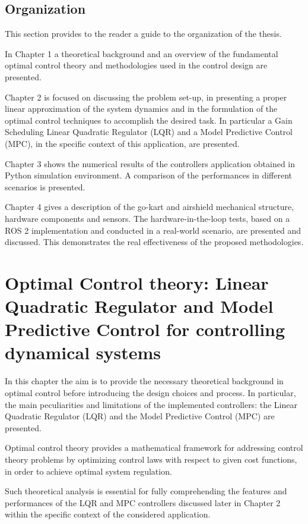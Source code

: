 \documentclass[a4paper,12pt,oneside]{book}
\begin{document}
\section*{Organization}
This section provides to the reader a guide to the organization of the thesis. 

In Chapter 1 a theoretical background and an overview of the fundamental optimal control theory and methodologies used in the control design are presented. 

Chapter 2 is focused on discussing the problem set-up, in presenting a proper linear approximation of the system dynamics and in the formulation of the optimal control techniques to accomplish the desired task.
In particular a Gain Scheduling Linear Quadratic Regulator (LQR) and a Model Predictive Control (MPC), in the specific context of this application, are presented.

Chapter 3 shows the numerical results of the controllers application obtained in Python simulation environment. A comparison of the performances in different scenarios is presented.

Chapter 4 gives a description of the go-kart and airshield mechanical structure, hardware components and sensors. 
The hardware-in-the-loop tests, based on a ROS 2 implementation and conducted in a real-world scenario, are presented and discussed.
This demonstrates the real effectiveness of the proposed methodologies.

\chapter{Optimal Control theory: Linear Quadratic Regulator and Model Predictive Control for controlling dynamical systems}
In this chapter the aim is to provide the necessary theoretical background in optimal control before introducing the design choices and process.
In particular, the main peculiarities and limitations of the implemented controllers: the Linear Quadratic Regulator (LQR) and the Model Predictive Control (MPC) are presented.

Optimal control theory provides a mathematical framework for addressing control theory problems by optimizing control laws with respect to given cost functions, in order to achieve optimal system regulation.

Such theoretical analysis is essential for fully comprehending the features and performances of the LQR and MPC controllers discussed later in Chapter 2 within the specific context of the considered application.
\end{document}
